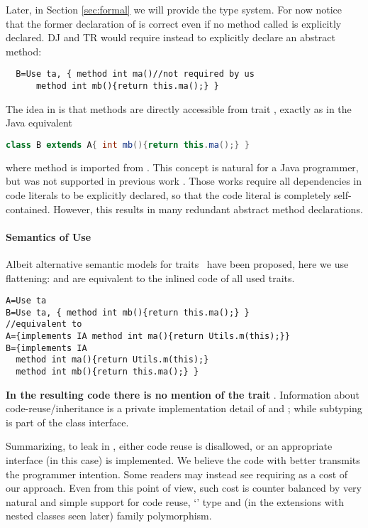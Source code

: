 Later, in Section \ref{sec:formal} we will provide the type
system. 
For now notice that the former declaration of \Q@B@ is correct even if
no method called \Q@ma@ is explicitly declared.
DJ and TR would require instead to explicitly declare an abstract \Q@ma@ method:
\saveSpace\saveSpace
\begin{lstlisting}
  B=Use ta, { method int ma()//not required by us
      method int mb(){return this.ma();} }
\end{lstlisting}
\saveSpace\saveSpace
\noindent
The idea in \name is that methods are directly accessible from trait \Q@ta@, exactly as in the Java equivalent
\saveSpace\saveSpace\begin{lstlisting}[language=Java]
  class B extends A{ int mb(){return this.ma();} }  
\end{lstlisting}
\saveSpace\saveSpace
where method \Q@ma@ is imported from \Q@A@.
This concept is natural for a Java programmer, but was not supported
in previous work \cite{BETTINI2013521,deep}. Those works require all
dependencies in code literals to be explicitly declared, so that the
code literal is completely self-contained. However, this results in
many redundant abstract method declarations.

\paragraph{Semantics of Use}
Albeit alternative semantic models for traits~\cite{lagorio2009featherweight} have been proposed,
here we use flattening: \Q@A@ and \Q@B@ are equivalent to the inlined code of all used traits.
\saveSpace\begin{lstlisting}
A=Use ta
B=Use ta, { method int mb(){return this.ma();} }
//equivalent to
A={implements IA method int ma(){return Utils.m(this);}}
B={implements IA
  method int ma(){return Utils.m(this);}
  method int mb(){return this.ma();} } 
 \end{lstlisting}
\saveSpace 
\textbf{In the resulting code there is no mention of the trait
 \Q@ta@}. Information about code-reuse/inheritance
  is a private implementation detail of \Q@A@
 and \Q@B@; while subtyping is part of the class interface.


Summarizing, to leak \Q@this@ in \name, either code reuse is disallowed, or an appropriate interface (\Q@IA@ in this case) is implemented.
We believe the code with \Q@IA@ better transmits the programmer intention. Some
readers may instead see requiring \Q@IA@ as a cost of our approach.
Even from this point of view, such cost is counter balanced by 
very natural and simple support for code reuse, `\Q@This@' type and (in the extensions with nested classes seen later)
family polymorphism.






